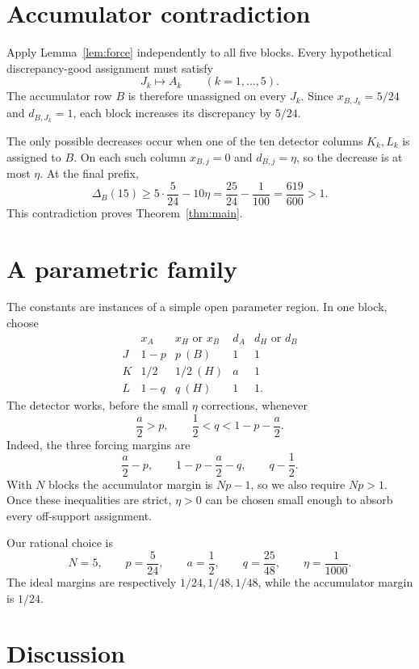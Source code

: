 \documentclass[11pt]{article}
\theoremstyle{definition}
\newcommand{\disc}{\Delta}
\begin{document}
\section{Accumulator contradiction}

Apply Lemma~\ref{lem:force} independently to all five blocks.  Every
hypothetical discrepancy-good assignment must satisfy
\[
 J_k\longmapsto A_k\qquad(k=1,\ldots,5).
\]
The accumulator row $B$ is therefore unassigned on every $J_k$.  Since
$x_{B,J_k}=5/24$ and $d_{B,J_k}=1$, each block increases its discrepancy by
$5/24$.

The only possible decreases occur when one of the ten detector columns
$K_k,L_k$ is assigned to $B$.  On each such column $x_{B,j}=0$ and
$d_{B,j}=\eta$, so the decrease is at most $\eta$.  At the final prefix,
\[
 \disc_B(15)
 \ge 5\cdot\frac5{24}-10\eta
 =\frac{25}{24}-\frac1{100}
 =\frac{619}{600}>1.
\]
This contradiction proves Theorem~\ref{thm:main}.

\section{A parametric family}

The constants are instances of a simple open parameter region.  In one
block, choose
\[
\begin{array}{c|cc|cc}
 & x_A & x_H\text{ or }x_B & d_A & d_H\text{ or }d_B\\
\hline
J & 1-p & p\ (B) & 1 & 1\\
K & 1/2 & 1/2\ (H) & a & 1\\
L & 1-q & q\ (H) & 1 & 1.
\end{array}
\]
The detector works, before the small $\eta$ corrections, whenever
\[
 \frac a2>p,
 \qquad
 \frac12<q<1-p-\frac a2.
\]
Indeed, the three forcing margins are
\[
 \frac a2-p,
 \qquad
 1-p-\frac a2-q,
 \qquad
 q-\frac12.
\]
With $N$ blocks the accumulator margin is $Np-1$, so we also require
$Np>1$.  Once these inequalities are strict, $\eta>0$ can be chosen small
enough to absorb every off-support assignment.

Our rational choice is
\[
 N=5,\qquad p=\frac5{24},\qquad a=\frac12,
 \qquad q=\frac{25}{48},\qquad \eta=\frac1{1000}.
\]
The ideal margins are respectively $1/24,1/48,1/48$, while the accumulator
margin is $1/24$.

\section{Discussion}
\end{document}
